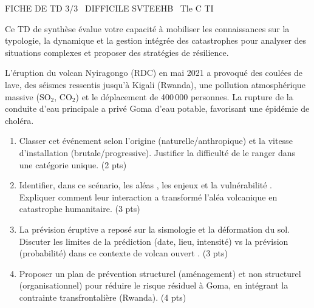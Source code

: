 \documentclass[11pt]{article}
\begin{document}
\begin{tcolorbox}[enhanced,colback=popink,colframe=popink,arc=10pt,boxrule=0pt,left=12pt,right=12pt,top=9pt,bottom=9pt]
{\color{white}\popxbold\small FICHE DE TD 3/3 \textbullet\ DIFFICILE \hfill SVTEEHB \textbullet\ Tle C TI\par}
\end{tcolorbox}
\vspace{4pt}
Ce TD de synthèse évalue votre capacité à mobiliser les connaissances sur la typologie, la dynamique et la gestion intégrée des catastrophes pour analyser des situations complexes et proposer des stratégies de résilience.

\begin{exercice}
L'éruption du volcan Nyiragongo (RDC) en mai 2021 a provoqué des coulées de lave, des séismes ressentis jusqu'à Kigali (Rwanda), une pollution atmosphérique massive (SO$_2$, CO$_2$) et le déplacement de 400\,000 personnes. La rupture de la conduite d'eau principale a privé Goma d'eau potable, favorisant une épidémie de choléra.
\begin{enumerate}
    \item Classer cet événement selon l'origine (naturelle/anthropique) et la vitesse d'installation (brutale/progressive). Justifier la difficulté de le ranger dans une catégorie unique. \hfill (2 pts)
    \item Identifier, dans ce scénario, les \og aléas \fg{}, les \og enjeux \fg{} et la \og vulnérabilité \fg{}. Expliquer comment leur interaction a transformé l'aléa volcanique en catastrophe humanitaire. \hfill (3 pts)
    \item La prévision éruptive a reposé sur la sismologie et la déformation du sol. Discuter les limites de la \og prédiction \fg{} (date, lieu, intensité) vs la \og prévision \fg{} (probabilité) dans ce contexte de volcan \og ouvert \fg{}. \hfill (3 pts)
    \item Proposer un plan de prévention structurel (aménagement) et non structurel (organisationnel) pour réduire le risque résiduel à Goma, en intégrant la contrainte transfrontalière (Rwanda). \hfill (4 pts)
\end{enumerate}
\end{exercice}
\end{document}
